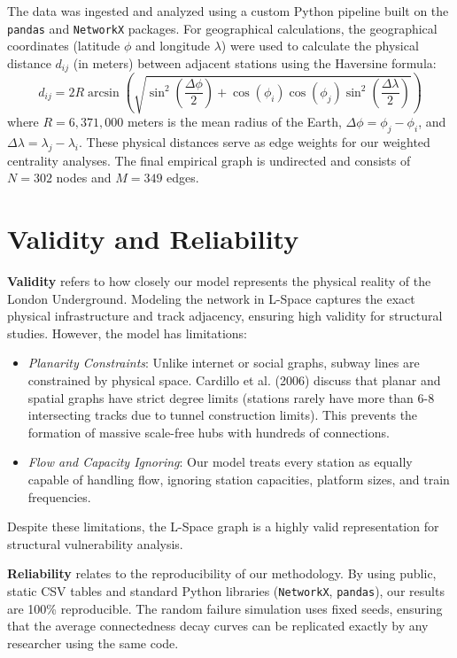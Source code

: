 \documentclass[12pt, a4paper]{article}
\begin{document}
The data was ingested and analyzed using a custom Python pipeline built on the \texttt{pandas} and \texttt{NetworkX} packages. For geographical calculations, the geographical coordinates (latitude $\phi$ and longitude $\lambda$) were used to calculate the physical distance $d_{ij}$ (in meters) between adjacent stations using the Haversine formula:
\begin{equation}
    d_{ij} = 2R \arcsin\left(\sqrt{\sin^2\left(\frac{\Delta \phi}{2}\right) + \cos(\phi_i)\cos(\phi_j)\sin^2\left(\frac{\Delta \lambda}{2}\right)}\right)
\end{equation}
where $R = 6,371,000$ meters is the mean radius of the Earth, $\Delta \phi = \phi_j - \phi_i$, and $\Delta \lambda = \lambda_j - \lambda_i$. These physical distances serve as edge weights for our weighted centrality analyses. The final empirical graph is undirected and consists of $N = 302$ nodes and $M = 349$ edges.

\section{Validity and Reliability}
\label{validity-and-reliability-not-needed-for-the-project-proposal}
\textbf{Validity} refers to how closely our model represents the physical reality of the London Underground. Modeling the network in L-Space captures the exact physical infrastructure and track adjacency, ensuring high validity for structural studies. However, the model has limitations:
\begin{itemize}
    \item \textit{Planarity Constraints}: Unlike internet or social graphs, subway lines are constrained by physical space. Cardillo et al. (2006) discuss that planar and spatial graphs have strict degree limits (stations rarely have more than 6-8 intersecting tracks due to tunnel construction limits). This prevents the formation of massive scale-free hubs with hundreds of connections.
    \item \textit{Flow and Capacity Ignoring}: Our model treats every station as equally capable of handling flow, ignoring station capacities, platform sizes, and train frequencies.
\end{itemize}
Despite these limitations, the L-Space graph is a highly valid representation for structural vulnerability analysis.

\textbf{Reliability} relates to the reproducibility of our methodology. By using public, static CSV tables and standard Python libraries (\texttt{NetworkX}, \texttt{pandas}), our results are 100\% reproducible. The random failure simulation uses fixed seeds, ensuring that the average connectedness decay curves can be replicated exactly by any researcher using the same code.
\end{document}
